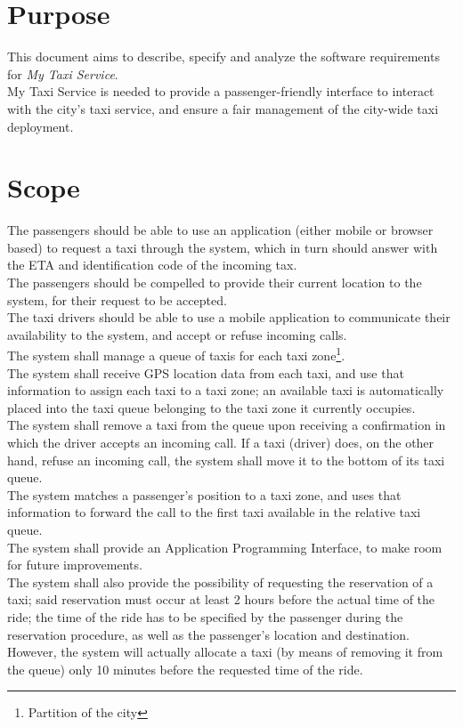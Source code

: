 \section{Purpose}
This document aims to describe, specify and analyze the software requirements for \textit{My Taxi Service}. \\
My Taxi Service is needed to provide a passenger-friendly interface to interact with the city's taxi service, and ensure
a fair management of the city-wide taxi deployment.


\section{Scope}
The passengers should be able to use an application (either mobile or browser based) to request a taxi through the system,
which in turn should answer with the ETA and identification code of the incoming tax. \\
The passengers should be compelled to provide their current location to the system, for their request to be accepted. \\
The taxi drivers should be able to use a mobile application to communicate their availability to the system, and accept
 or refuse incoming calls. \\
The system shall manage a queue of taxis for each taxi zone\footnote{Partition of the city}. \\
The system shall receive GPS location data from each taxi, and use that information to assign each taxi to a 
taxi zone; an available taxi is automatically placed into the taxi queue belonging to the taxi zone it currently occupies. \\
The system shall remove a taxi from the queue upon receiving a confirmation in which the driver accepts an incoming call.
 If a taxi (driver) does, on the other hand, refuse an incoming call, the system
shall move it to the bottom of its taxi queue. \\
The system matches a passenger's position to a taxi zone, and uses that information to forward the call to the first taxi
available in the relative taxi queue. \\
The system shall provide an Application Programming Interface, to make room for future improvements. \\
The system shall also provide the possibility of requesting the reservation of a taxi; said reservation must occur at least
2 hours before the actual time of the ride; the time of the ride has to be specified by the passenger during the
reservation procedure, as well as the passenger's location and destination. \\
However, the system will actually allocate a taxi (by means of removing it from the queue) only 10 minutes before the
requested time of the ride.


